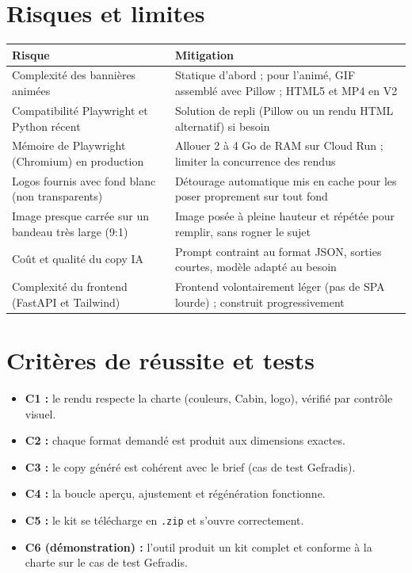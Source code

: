 \documentclass[11pt,a4paper]{article}
\begin{document}
\section{Risques et limites}
\begin{center}\small
\begin{tabular}{@{}>{\raggedright\arraybackslash}p{5.2cm} >{\raggedright\arraybackslash}p{9.5cm}@{}}
\toprule
\textbf{Risque} & \textbf{Mitigation} \\
\midrule
Complexité des bannières animées & Statique d'abord ; pour l'animé, GIF assemblé avec Pillow ; HTML5 et MP4 en V2 \\
Compatibilité Playwright et Python récent & Solution de repli (Pillow ou un rendu HTML alternatif) si besoin \\
Mémoire de Playwright (Chromium) en production & Allouer 2 à 4 Go de RAM sur Cloud Run ; limiter la concurrence des rendus \\
Logos fournis avec fond blanc (non transparents) & Détourage automatique mis en cache pour les poser proprement sur tout fond \\
Image presque carrée sur un bandeau très large (9:1) & Image posée à pleine hauteur et répétée pour remplir, sans rogner le sujet \\
Coût et qualité du copy IA & Prompt contraint au format JSON, sorties courtes, modèle adapté au besoin \\
Complexité du frontend (FastAPI et Tailwind) & Frontend volontairement léger (pas de SPA lourde) ; construit progressivement \\
\bottomrule
\end{tabular}
\end{center}

\section{Critères de réussite et tests}
\begin{itemize}[leftmargin=1.4em]
  \item \textbf{C1 :} le rendu respecte la charte (couleurs, Cabin, logo), vérifié par contrôle visuel.
  \item \textbf{C2 :} chaque format demandé est produit aux dimensions exactes.
  \item \textbf{C3 :} le copy généré est cohérent avec le brief (cas de test Gefradis).
  \item \textbf{C4 :} la boucle aperçu, ajustement et régénération fonctionne.
  \item \textbf{C5 :} le kit se télécharge en \texttt{.zip} et s'ouvre correctement.
  \item \textbf{C6 (démonstration) :} l'outil produit un kit complet et conforme à
        la charte sur le cas de test Gefradis.
\end{itemize}
\end{document}
